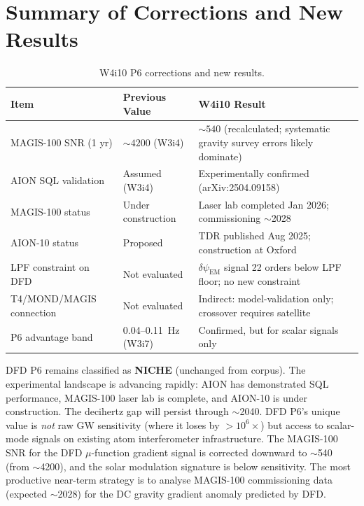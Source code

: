 \documentclass[11pt]{article}
\theoremstyle{definition}
\theoremstyle{remark}
\newcommand{\dpsiem}{\delta\psi_{\mathrm{EM}}}
\begin{document}
\section{Summary of Corrections and New Results}
\label{sec:summary}

\begin{table}[H]
\centering
\caption{W4i10 P6 corrections and new results.}
\label{tab:corrections}
\begin{tabular}{@{}p{4cm}p{3cm}p{5cm}@{}}
\toprule
Item & Previous Value & W4i10 Result \\
\midrule
MAGIS-100 SNR (1 yr) & $\sim 4200$ (W3i4) &
  $\sim 540$ (recalculated; systematic gravity survey errors likely
  dominate) \\[4pt]
AION SQL validation & Assumed (W3i4) &
  Experimentally confirmed (arXiv:2504.09158) \\[4pt]
MAGIS-100 status & Under construction & Laser lab completed Jan 2026;
  commissioning $\sim$2028 \\[4pt]
AION-10 status & Proposed & TDR published Aug 2025; construction at
  Oxford \\[4pt]
LPF constraint on DFD & Not evaluated & $\dpsiem$ signal 22 orders
  below LPF floor; no new constraint \\[4pt]
T4/MOND/MAGIS connection & Not evaluated & Indirect: model-validation
  only; crossover requires satellite \\[4pt]
P6 advantage band & 0.04--0.11~Hz (W3i7) & Confirmed, but for scalar
  signals only \\
\bottomrule
\end{tabular}
\end{table}

\begin{tcolorbox}[colback=green!5!white, colframe=green!60!black,
  title=\textbf{NET ASSESSMENT}]
DFD P6 remains classified as \textbf{NICHE} (unchanged from corpus).
The experimental landscape is advancing rapidly: AION has demonstrated
SQL performance, MAGIS-100 laser lab is complete, and AION-10 is under
construction. The decihertz gap will persist through $\sim$2040. DFD P6's
unique value is \emph{not} raw GW sensitivity (where it loses by $>10^6\times$)
but access to scalar-mode signals on existing atom interferometer infrastructure.
The MAGIS-100 SNR for the DFD $\mu$-function gradient signal is corrected
downward to $\sim$540 (from $\sim$4200), and the solar modulation signature
is below sensitivity. The most productive near-term strategy is to analyse
MAGIS-100 commissioning data (expected $\sim$2028) for the DC gravity gradient
anomaly predicted by DFD.
\end{tcolorbox}
\end{document}
